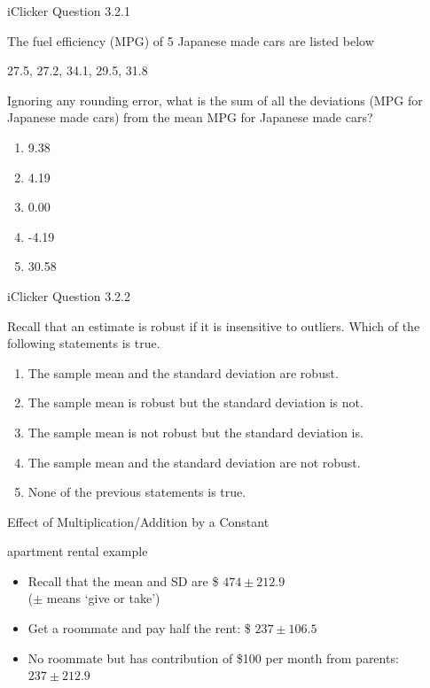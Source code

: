 \documentclass[14pt]{beamer}\usepackage[]{graphicx}\usepackage[]{color}
\begin{document}
\begin{frame}[fragile]{iClicker Question 3.2.1}

The fuel efficiency (MPG) of 5 Japanese made cars are listed below

27.5,	27.2,	34.1,	29.5,	31.8

Ignoring any rounding error, what is the sum of all the deviations (MPG  for Japanese made cars) from the mean MPG for Japanese made  cars?

\begin{enumerate}
\item 9.38
\item 4.19
\item 0.00
\item -4.19
\item 30.58
\end{enumerate}
\end{frame}

\begin{frame}[fragile]{iClicker Question 3.2.2}

Recall that an estimate is robust if it is insensitive to outliers. Which of  the following statements is true.

\begin{enumerate}
\item The sample mean and the standard deviation are robust.
\item The sample mean is robust but the standard deviation is  not.
\item The sample mean is not robust but the standard deviation  is.
\item The sample mean and the standard deviation are not  robust.
\item None of the previous statements is true.
\end{enumerate}
\end{frame}

\begin{frame}[fragile]{Effect of Multiplication/Addition by a Constant}



\begin{center}
apartment rental example
\end{center}

\begin{itemize}
\item<1-> Recall that the mean and SD are \$ $474 \pm 212.9$ \\ ($\pm$ means `give or take')
\item<2-> Get a roommate and pay half the rent: \$ $237 \pm 106.5$ %
\item<3-> No roommate but has contribution of \$100 per month from parents: $237 \pm 212.9$    %
\end{itemize}
\end{frame}
\end{document}
